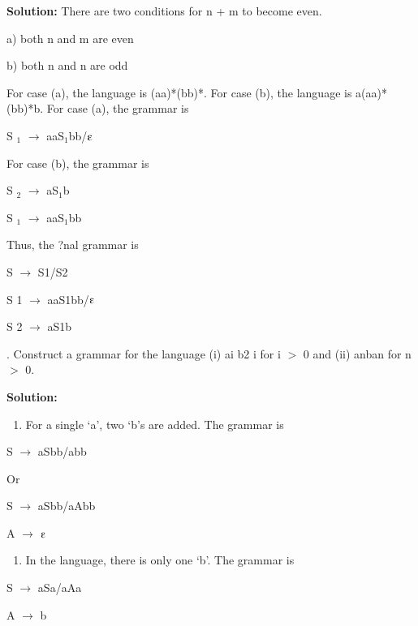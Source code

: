 \documentclass{article} %
\begin{document}
\noindent \textbf{Solution:} There are two conditions for n + m to become even.

\noindent  a) both n and m are even 

\noindent b) both n and n are odd

\noindent For case (a), the language is (aa)*(bb)*. For case (b), the language is a(aa)*(bb)*b. For case (a), the grammar is

\noindent S ${}_{1}$ $\mathrm{\to}$ aaS${}_{1}$bb/$\varepsilonup$

\noindent  For case (b), the grammar is

\noindent S ${}_{2}$ $\mathrm{\to}$ aS${}_{1}$b

\noindent  S ${}_{1}$ $\mathrm{\to}$ aaS${}_{1}$bb

\noindent Thus, the ?nal grammar is

\noindent S $\mathrm{\to}$ S1/S2

\noindent  S 1 $\mathrm{\to}$ aaS1bb/$\varepsilonup$

\noindent  S 2 $\mathrm{\to}$ aS1b

. Construct a grammar for the language (i) ai b2 i for i $\mathrm{>}$ 0 and (ii) anban for n $\mathrm{>}$ 0. 


\noindent \textbf{Solution:}

\begin{enumerate}
\item \textbf{ }For a single `a', two `b's are added. The grammar is 
\end{enumerate}

\noindent S $\mathrm{\to}$ aSbb/abb

\noindent  Or

\noindent  S $\mathrm{\to}$ aSbb/aAbb

\noindent  A $\mathrm{\to}$ $\varepsilonup$

\begin{enumerate}
\item  In the language, there is only one `b'. The grammar is
\end{enumerate}

\noindent S $\mathrm{\to}$ aSa/aAa 

\noindent A $\mathrm{\to}$ b

\noindent 

\noindent 

\noindent 

\noindent 
\end{document}
